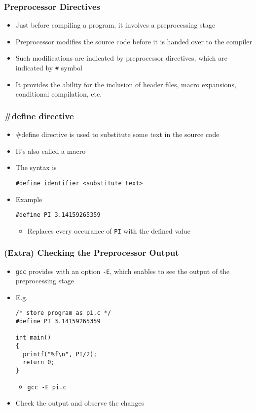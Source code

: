 \documentclass[11pt]{beamer}
\begin{document}
\begin{frame}[fragile]\frametitle{Preprocessor Directives}
\label{sec-1-16}

\begin{itemize}
\item Just before compiling a program, it involves a preprocessing stage
\item Preprocessor modifies the source code before it is handed over to the compiler
\item Such modifications are indicated by preprocessor directives, which are indicated by \verb~#~ symbol
\item It provides the ability for the inclusion of header files, macro expansions, conditional compilation, etc.
\end{itemize}
\end{frame}
\begin{frame}[fragile]\frametitle{\#define directive}
\label{sec-1-17}

\begin{itemize}
\item \#define directive is used to substitute some text in the source code
\item It's also called a macro
\item The syntax is 

\begin{verbatim}
#define identifier <substitute text>
\end{verbatim}
\item Example 

\begin{verbatim}
#define PI 3.14159265359
\end{verbatim}
\begin{itemize}
\item Replaces every occurance of \verb~PI~ with the defined value
\end{itemize}
\end{itemize}
\end{frame}
\begin{frame}[fragile]\frametitle{(Extra) Checking the Preprocessor Output}
\label{sec-1-18}

\begin{itemize}
\item \verb~gcc~ provides with an option \verb~-E~, which enables to see the output of the preprocessing stage
\item E.g. 

\begin{verbatim}
/* store program as pi.c */
#define PI 3.14159265359

int main()
{
  printf("%f\n", PI/2);
  return 0;
}
\end{verbatim}
\begin{itemize}
\item \verb~gcc -E pi.c~
\end{itemize}
\item Check the output and observe the changes
\end{itemize}
\end{frame}
\end{document}
